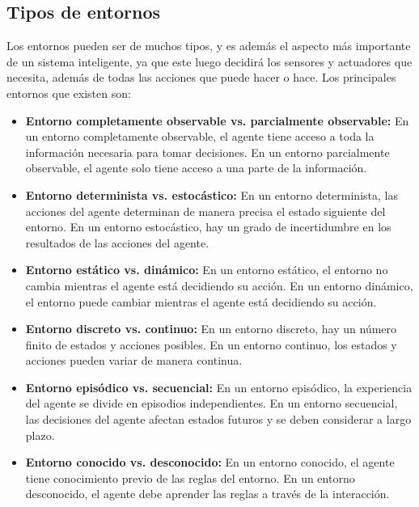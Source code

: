 \subsection{Tipos de entornos}

Los entornos pueden ser de muchos tipos, y es además el aspecto más importante de un sistema inteligente, ya que este luego decidirá los sensores y actuadores que necesita, además de todas las acciones que puede hacer o hace. Los principales entornos que existen son:

\begin{itemize}
    \item \textbf{Entorno completamente observable vs. parcialmente observable:} En un entorno completamente observable, el agente tiene acceso a toda la información necesaria para tomar decisiones. En un entorno parcialmente observable, el agente solo tiene acceso a una parte de la información.
    \item \textbf{Entorno determinista vs. estocástico:} En un entorno determinista, las acciones del agente determinan de manera precisa el estado siguiente del entorno. En un entorno estocástico, hay un grado de incertidumbre en los resultados de las acciones del agente.
    \item \textbf{Entorno estático vs. dinámico:} En un entorno estático, el entorno no cambia mientras el agente está decidiendo su acción. En un entorno dinámico, el entorno puede cambiar mientras el agente está decidiendo su acción.
    \item \textbf{Entorno discreto vs. continuo:} En un entorno discreto, hay un número finito de estados y acciones posibles. En un entorno continuo, los estados y acciones pueden variar de manera continua.
    \item \textbf{Entorno episódico vs. secuencial:} En un entorno episódico, la experiencia del agente se divide en episodios independientes. En un entorno secuencial, las decisiones del agente afectan estados futuros y se deben considerar a largo plazo.
    \item \textbf{Entorno conocido vs. desconocido:} En un entorno conocido, el agente tiene conocimiento previo de las reglas del entorno. En un entorno desconocido, el agente debe aprender las reglas a través de la interacción.
\end{itemize}